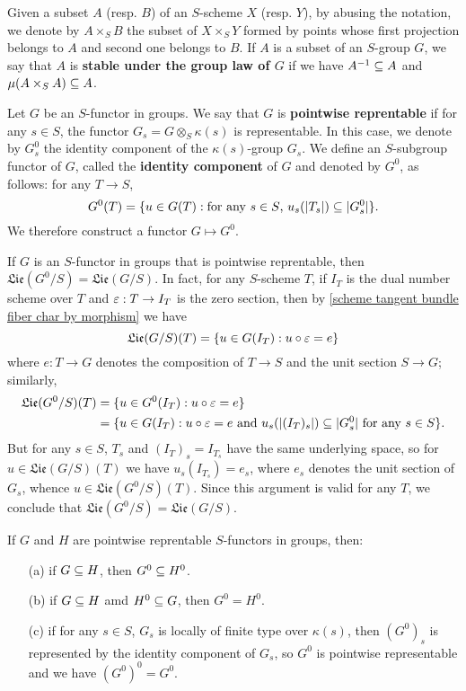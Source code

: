 Given a subset $A$ (resp. $B$) of an $S$-scheme $X$ (resp. $Y$), by abusing the notation, we denote by $A\times_SB$ the subset of $X\times_SY$ formed by points whose first projection belongs to $A$ and second one belongs to $B$. If $A$ is a subset of an $S$-group $G$, we say that $A$ is \textbf{stable under the group law of $G$} if we have $A^{-1}\subseteq A$ and $\mu(A\times_SA)\subseteq A$.\par

Let $G$ be an $S$-functor in groups. We say that $G$ is \textbf{pointwise reprentable} if for any $s\in S$, the functor $G_s=G\otimes_S\kappa(s)$ is representable. In this case, we denote by $G^0_s$ the identity component of the $\kappa(s)$-group $G_s$. We define an $S$-subgroup functor of $G$, called the \textbf{identity component} of $G$ and denoted by $G^0$, as follows: for any $T\to S$,
\[G^0(T)=\{u\in G(T):\text{for any $s\in S$, $u_s(|T_s|)\subseteq|G_s^0|$}\}.\]
We therefore construct a functor $G\mapsto G^0$.

\begin{remark}\label{scheme group Lie alg of connected component}
If $G$ is an $S$-functor in groups that is pointwise reprentable, then $\mathfrak{Lie}(G^0/S)=\mathfrak{Lie}(G/S)$. In fact, for any $S$-scheme $T$, if $I_T$ is the dual number scheme over $T$ and $\varepsilon:T\to I_T$ is the zero section, then by \cref{scheme tangent bundle fiber char by morphism} we have
\[\mathfrak{Lie}(G/S)(T)=\{u\in G(I_T):u\circ\varepsilon=e\}\]
where $e:T\to G$ denotes the composition of $T\to S$ and the unit section $S\to G$; similarly,
\begin{align*}
\mathfrak{Lie}(G^0/S)(T)&=\{u\in G^0(I_T):u\circ\varepsilon=e\}\\
&=\{u\in G(I_T):\text{$u\circ\varepsilon=e$ and $u_s(|(I_T)_s|)\subseteq|G_s^0|$ for any $s\in S$}\}.
\end{align*}
But for any $s\in S$, $T_s$ and $(I_T)_s=I_{T_s}$ have the same underlying space, so for $u\in\mathfrak{Lie}(G/S)(T)$ we have $u_s(I_{T_s})=e_s$, where $e_s$ denotes the unit section of $G_s$, whence $u\in \mathfrak{Lie}(G^0/S)(T)$. Since this argument is valid for any $T$, we conclude that $\mathfrak{Lie}(G^0/S)=\mathfrak{Lie}(G/S)$.
\end{remark}

\begin{remark}
If $G$ and $H$ are pointwise reprentable $S$-functors in groups, then:
\begin{enumerate}
    \item[(a)] if $G\subseteq H$, then $G^0\subseteq H^0$.
    \item[(b)] if $G\subseteq H$ amd $H^0\subseteq G$, then $G^0=H^0$.
    \item[(c)] if for any $s\in S$, $G_s$ is locally of finite type over $\kappa(s)$, then $(G^0)_s$ is represented by the identity component of $G_s$, so $G^0$ is pointwise representable and we have $(G^0)^0=G^0$.
\end{enumerate}
\end{remark}


